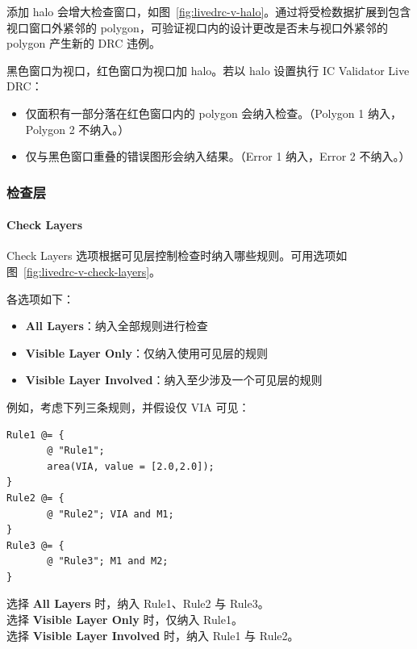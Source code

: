 添加 halo 会增大检查窗口，如图~\ref{fig:livedrc-v-halo}。通过将受检数据扩展到包含视口窗口外紧邻的 polygon，可验证视口内的设计更改是否未与视口外紧邻的 polygon 产生新的 DRC 违例。


黑色窗口为视口，红色窗口为视口加 halo。若以 halo 设置执行 IC Validator Live DRC：
\begin{itemize}
  \item 仅面积有一部分落在红色窗口内的 polygon 会纳入检查。（Polygon 1 纳入，Polygon 2 不纳入。）
  \item 仅与黑色窗口重叠的错误图形会纳入结果。（Error 1 纳入，Error 2 不纳入。）
\end{itemize}

\subsubsection{检查层}
\paragraph*{Check Layers}

Check Layers 选项根据可见层控制检查时纳入哪些规则。可用选项如图~\ref{fig:livedrc-v-check-layers}。


各选项如下：
\begin{itemize}
  \item \textbf{All Layers}：纳入全部规则进行检查
  \item \textbf{Visible Layer Only}：仅纳入使用可见层的规则
  \item \textbf{Visible Layer Involved}：纳入至少涉及一个可见层的规则
\end{itemize}

例如，考虑下列三条规则，并假设仅 VIA 可见：
\begin{lstlisting}[style=pxl]
Rule1 @= {
       @ "Rule1";
       area(VIA, value = [2.0,2.0]);
}
Rule2 @= {
       @ "Rule2"; VIA and M1;
}
Rule3 @= {
       @ "Rule3"; M1 and M2;
}
\end{lstlisting}

选择 \textbf{All Layers} 时，纳入 Rule1、Rule2 与 Rule3。\\
选择 \textbf{Visible Layer Only} 时，仅纳入 Rule1。\\
选择 \textbf{Visible Layer Involved} 时，纳入 Rule1 与 Rule2。

